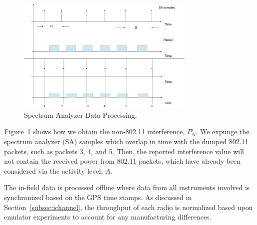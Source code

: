 \begin{figure} 
\centering
\includegraphics[width=85mm]{figures/sa_process}
\vspace{-0.1in}
\caption{Spectrum Analyzer Data Processing.}
\label{fig:sa_process}
\vspace{0.1in}
\end{figure}

Figure~\ref{fig:sa_process} shows how we obtain the
non-802.11 interference, $P_N^i$. We expunge the spectrum analyzer
(SA) samples which overlap in time with the dumped 802.11 packets,
such as packets 3, 4, and 5. Then, the reported interference value
will not contain the received power from 802.11 packets, which have
already been considered via the activity level, $A$.

The in-field data is processed offline where data from all instruments
involved is synchronized based on the GPS time stamps. 
As discussed in Section~\ref{subsec:ichannel}, the throughput of each radio
is normalized based upon emulator experiments to account for any
manufacturing differences.

